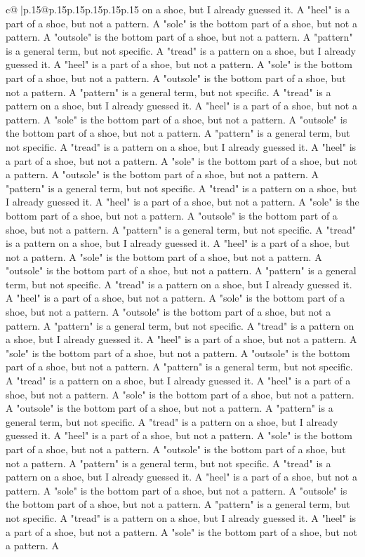 \documentclass{article}
\begin{document}
{\begin{supertabular}{c@{$\;$}|p{.15\linewidth}@{}p{.15\linewidth}p{.15\linewidth}p{.15\linewidth}p{.15\linewidth}p{.15\linewidth}}
{{{on a shoe, but I already guessed it. A "heel" is a part of a shoe, but not a pattern. A "sole" is the bottom part of a shoe, but not a pattern. A "outsole" is the bottom part of a shoe, but not a pattern. A "pattern" is a general term, but not specific. A "tread" is a pattern on a shoe, but I already guessed it. A "heel" is a part of a shoe, but not a pattern. A "sole" is the bottom part of a shoe, but not a pattern. A "outsole" is the bottom part of a shoe, but not a pattern. A "pattern" is a general term, but not specific. A "tread" is a pattern on a shoe, but I already guessed it. A "heel" is a part of a shoe, but not a pattern. A "sole" is the bottom part of a shoe, but not a pattern. A "outsole" is the bottom part of a shoe, but not a pattern. A "pattern" is a general term, but not specific. A "tread" is a pattern on a shoe, but I already guessed it. A "heel" is a part of a shoe, but not a pattern. A "sole" is the bottom part of a shoe, but not a pattern. A "outsole" is the bottom part of a shoe, but not a pattern. A "pattern" is a general term, but not specific. A "tread" is a pattern on a shoe, but I already guessed it. A "heel" is a part of a shoe, but not a pattern. A "sole" is the bottom part of a shoe, but not a pattern. A "outsole" is the bottom part of a shoe, but not a pattern. A "pattern" is a general term, but not specific. A "tread" is a pattern on a shoe, but I already guessed it. A "heel" is a part of a shoe, but not a pattern. A "sole" is the bottom part of a shoe, but not a pattern. A "outsole" is the bottom part of a shoe, but not a pattern. A "pattern" is a general term, but not specific. A "tread" is a pattern on a shoe, but I already guessed it. A "heel" is a part of a shoe, but not a pattern. A "sole" is the bottom part of a shoe, but not a pattern. A "outsole" is the bottom part of a shoe, but not a pattern. A "pattern" is a general term, but not specific. A "tread" is a pattern on a shoe, but I already guessed it. A "heel" is a part of a shoe, but not a pattern. A "sole" is the bottom part of a shoe, but not a pattern. A "outsole" is the bottom part of a shoe, but not a pattern. A "pattern" is a general term, but not specific. A "tread" is a pattern on a shoe, but I already guessed it. A "heel" is a part of a shoe, but not a pattern. A "sole" is the bottom part of a shoe, but not a pattern. A "outsole" is the bottom part of a shoe, but not a pattern. A "pattern" is a general term, but not specific. A "tread" is a pattern on a shoe, but I already guessed it. A "heel" is a part of a shoe, but not a pattern. A "sole" is the bottom part of a shoe, but not a pattern. A "outsole" is the bottom part of a shoe, but not a pattern. A "pattern" is a general term, but not specific. A "tread" is a pattern on a shoe, but I already guessed it. A "heel" is a part of a shoe, but not a pattern. A "sole" is the bottom part of a shoe, but not a pattern. A "outsole" is the bottom part of a shoe, but not a pattern. A "pattern" is a general term, but not specific. A "tread" is a pattern on a shoe, but I already guessed it. A "heel" is a part of a shoe, but not a pattern. A "sole" is the bottom part of a shoe, but not a pattern. A }}}
\end{supertabular}}
\end{document}
